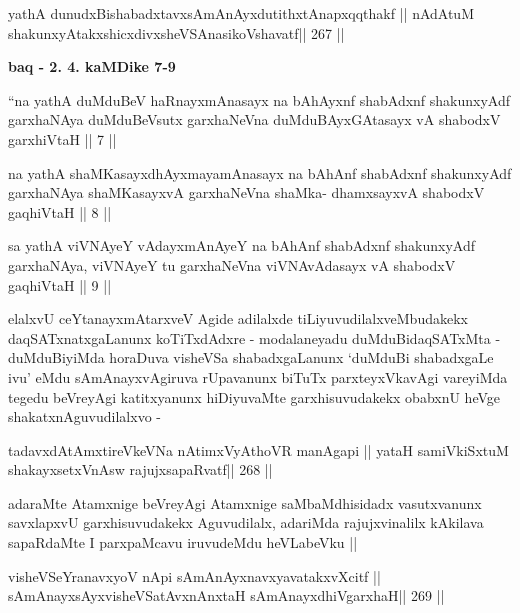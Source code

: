 \begin{shl}
yathA dunudxBishabadxtavxsAmAnAyxdutithxtAnapxqqthakf ||
nA\s\s dAtuM shakunxyAtakxshicxdivxsheVSAnasikoVshavatf\hfill || 267 ||
\end{shl}

\begin{artha}
{\bf baq - 2. 4. kaMDike 7-9}
\end{artha}

\begin{shl}
``na yathA duMduBeV haRnayxmAnasayx na bAhAyxnf shabAdxnf
shakunxyAdf garxhaNAya duMduBeVsutx garxhaNeVna
duMduBAyxGAtasayx vA shabodxV garxhiVtaH || 7 ||
\end{shl}

\begin{shl}
na yathA shaMKasayxdhAyxmayamAnasayx na bAhAnf shabAdxnf
shakunxyAdf garxhaNAya shaMKasayxvA garxhaNeVna shaMka-
dhamxsayxvA shabodxV gaqhiVtaH || 8 ||
\end{shl}

\begin{shl}
sa yathA viVNAyeY vAdayxmAnAyeY na bAhAnf
shabAdxnf shakunxyAdf garxhaNAya, viVNAyeY tu garxhaNeVna
viVNAvAdasayx vA shabodxV gaqhiVtaH || 9 ||
\end{shl}

\begin{artha}
elalxvU ceYtanayxmAtarxveV Agide adilalxde tiLiyuvudilalxveMbudakekx daqSATxnatxgaLanunx koTiTxdAdxre - modalaneyadu duMduBidaqSATxMta - duMduBiyiMda horaDuva visheVSa shabadxgaLanunx `duMduBi shabadxgaLe ivu' eMdu sAmAnayxvAgiruva rUpavanunx biTuTx parxteyxVkavAgi vareyiMda tegedu beVreyAgi katitxyanunx hiDiyuvaMte garxhisuvudakekx obabxnU heVge shakatxnAguvudilalxvo -
\end{artha}

\begin{shl}
tadavxdAtAmxtireVkeVNa nA\s\s timxVyAthoVR manAgapi ||
yataH samiVkiSxtuM shakayxsetxVnAsw rajujxsapaRvatf\hfill || 268 ||
\end{shl}

\begin{artha}
adaraMte Atamxnige beVreyAgi Atamxnige saMbaMdhisidadx vasutxvanunx savxlapxvU garxhisuvudakekx Aguvudilalx, adariMda rajujxvinalilx kAkilava sapaRdaMte I parxpaMcavu iruvudeMdu heVLabeVku ||
\end{artha}

\begin{shl}
visheVSeYranavxyoV nApi sAmAnAyxnavxyavatakxvXcitf ||
sAmAnayxsAyxvisheVSatAvxnAnxtaH sAmAnayxdhiVgarxhaH\hfill || 269 ||
\end{shl}

